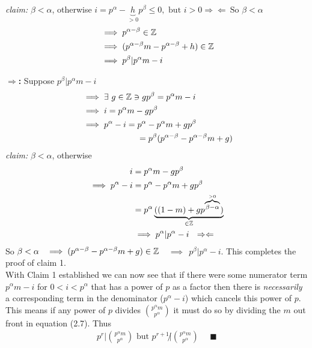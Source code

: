 \indent \textit{claim: } $\beta < \alpha$, otherwise $i=p^\alpha - \underbrace{h}_{>0}p^\beta \leq 0, \text{ but } i>0 \Rightarrow \Leftarrow \ \text{So } \beta < \alpha$
\begin{align}
    &\implies p^{\alpha -\beta} \in {\mathbb{ Z}} \nonumber \\
    &\implies (p^{\alpha-\beta}m-p^{\alpha-\beta}+h) \in {\mathbb{ Z}} \nonumber \\
    &\implies p^\beta | p^\alpha m -i \nonumber
\end{align}

\textbf{$\Rightarrow$:} Suppose $p^\beta | p^\alpha m -i$
\begin{align}
    &\implies \exists \ g \in {\mathbb{ Z}} \ni gp^\beta = p^\alpha m -i \nonumber \\
    &\implies i = p^\alpha m -gp^\beta \nonumber \\
    &\implies p^\alpha - i = p^\alpha - p^\alpha m + gp^\beta \nonumber \\
    & \ \ \ \ \ \ \ \ \ \ \ \ \ \ \ \ \ \ \ \ = p^\beta (p^{\alpha-\beta} -p^{\alpha-\beta}m + g) \nonumber
\end{align}
\indent \textit{claim: } $\beta < \alpha$, otherwise 
\begin{align}
    i &= p^\alpha m - gp^\beta \nonumber \\
    \implies p^\alpha -i &= p^\alpha - p^\alpha m + gp^\beta \nonumber \\
    &= p^\alpha \underbrace{((1-m)+gp^{\overbrace{\scriptstyle\beta-\alpha}^{>0}})}_{\in {\mathbb{ Z}}} \nonumber \\
    &\implies p^\alpha | p^\alpha - i \ \ \Rightarrow\Leftarrow \nonumber 
\end{align}
So $\beta < \alpha \ \ \implies (p^{\alpha-\beta}-p^{\alpha-\beta}m+g)\in \Z$ $ \ \ \ \implies \ \ p^\beta | p^\alpha - i$. This completes the proof of claim 1. \steezybreak\\
With Claim 1 established we can now see that if there were some numerator term $p^\alpha m - i$ for $0<i<p^\alpha$ that has a power of $p$ as a factor then there is \textit{necessarily} a corresponding term in the denominator ($p^\alpha -i$) which cancels this power of $p$. This means if any power of $p$ divides ${p^\alpha m \choose p^\alpha}$ it must do so by dividing the $m$ out front in equation (2.7). Thus
\begin{align}
    p^r | {p^\alpha m \choose p^\alpha} \text{ but } p^{r+1} \not | {p^\alpha m \choose p^\alpha} \ \ \ \ \ \ \blacksquare \nonumber 
\end{align}

